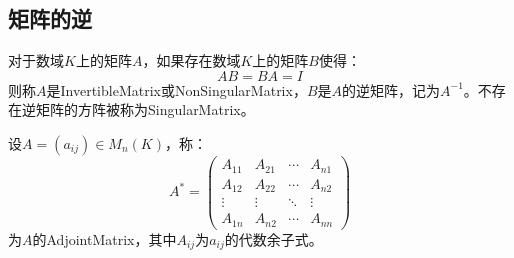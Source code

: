 \subsection{矩阵的逆}
\begin{definition}
	对于数域$K$上的矩阵$A$，如果存在数域$K$上的矩阵$B$使得：
	\begin{equation*}
		AB=BA=I
	\end{equation*}
	则称$A$是\gls{InvertibleMatrix}或\gls{NonSingularMatrix}，$B$是$A$的逆矩阵，记为$A^{-1}$。不存在逆矩阵的方阵被称为\gls{SingularMatrix}。
\end{definition}
\begin{definition}
	设$A=(a_{ij})\in M_{n}(K)$，称：
	\begin{equation*}
		A^*=
		\begin{pmatrix}
			A_{11} & A_{21} & \cdots & A_{n1} \\
			A_{12} & A_{22} & \cdots & A_{n2} \\
			\vdots & \vdots & \ddots &\vdots \\
			A_{1n} & A_{n2} & \cdots & A_{nn} 
		\end{pmatrix}
	\end{equation*}
	为$A$的\gls{AdjointMatrix}，其中$A_{ij}$为$a_{ij}$的代数余子式。
\end{definition}
